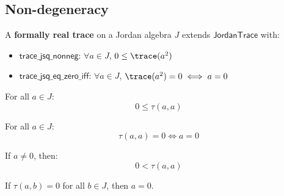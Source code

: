 \subsection{Non-degeneracy}

\begin{definition}[FormallyRealTrace]
A \textbf{formally real trace} on a Jordan algebra $J$ extends $\mathsf{JordanTrace}$ with:
\begin{itemize}
  \item $\mathsf{trace\_jsq\_nonneg}$: $\forall a \in J$, $0 \le \trace(\jsq{a})$
  \item $\mathsf{trace\_jsq\_eq\_zero\_iff}$: $\forall a \in J$, $\trace(\jsq{a}) = 0 \iff a = 0$
\end{itemize}
\end{definition}

\begin{theorem}
For all $a \in J$:
\[ 0 \le \tau(a, a) \]
\end{theorem}

\begin{theorem}
For all $a \in J$:
\[ \tau(a, a) = 0 \iff a = 0 \]
\end{theorem}

\begin{theorem}
If $a \ne 0$, then:
\[ 0 < \tau(a, a) \]
\end{theorem}

\begin{theorem}
If $\tau(a, b) = 0$ for all $b \in J$, then $a = 0$.
\end{theorem}
